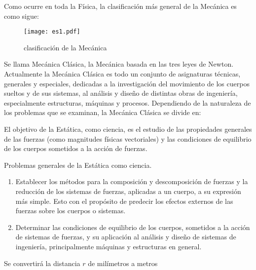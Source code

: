 Como ocurre en toda la Física, la clasificación más general de la Mecánica es como sigue:

\begin{figure}[h!]
	\centering
	\texttt{[image: es1.pdf]}
	\caption{clasificación de la Mecánica}
\end{figure}

Se llama Mecánica Clásica, la Mecánica basada en las tres leyes de Newton. Actualmente la
Mecánica Clásica es todo un conjunto de asignaturas técnicas, generales y especiales, dedicadas a
la investigación del movimiento de los cuerpos sueltos y de sus sistemas, al análisis y diseño de
distintas obras de ingeniería, especialmente estructuras, máquinas y procesos. Dependiendo de la
naturaleza de los problemas que se examinan, la Mecánica Clásica se divide en:


El objetivo de la Estática, como ciencia, es el estudio de las propiedades generales de las fuerzas
(como magnitudes físicas vectoriales) y las condiciones de equilibrio de los cuerpos sometidos
a la acción de fuerzas.

Problemas generales de la Estática como ciencia.

\begin{enumerate}
	\item Establecer los métodos para la composición y descomposición de fuerzas y la reducción
	      de los sistemas de fuerzas, aplicadas a un cuerpo, a su expresión más simple. Esto con el
	      propósito de predecir los efectos externos de las fuerzas sobre los cuerpos o sistemas.
	\item Determinar las condiciones de equilibrio de los cuerpos, sometidos a la acción de
	      sistemas de fuerzas, y su aplicación al análisis y diseño de sistemas de ingeniería,
	      principalmente máquinas y estructuras en general.
\end{enumerate}

Se convertirá la distancia $r$ de milímetros a metros

